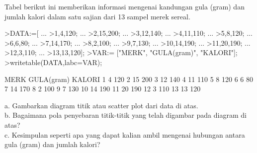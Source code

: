 \documentclass[a4paper,10pt]{article}
\begin{document}
\begin{eulernotebook}
\begin{eulercomment}
\begin{eulercomment}
\begin{eulercomment}
\begin{eulercomment}
\begin{eulercomment}
\begin{eulercomment}
\begin{eulercomment}
\begin{eulercomment}
\begin{eulercomment}
\begin{eulercomment}
\begin{eulercomment}
\begin{eulercomment}
\begin{eulercomment}
\begin{eulercomment}
\begin{eulercomment}
\begin{eulercomment}
\begin{eulercomment}
\end{eulercomment}
\eulersubheading{}
\begin{eulercomment}
Tabel berikut ini memberikan informasi mengenai kandungan gula (gram)
dan jumlah kalori dalam satu sajian dari 13 sampel merek sereal.
\end{eulercomment}
\begin{eulerprompt}
>DATA:=[ ...
>1,4,120; ...
>2,15,200; ...
>3,12,140; ...
>4,11,110; ...
>5,8,120; ...
>6,6,80; ...
>7,14,170; ...
>8,2,100; ...
>9,7,130; ...
>10,14,190; ...
>11,20,190; ...
>12,3,110; ...
>13,13,120];
>VAR:= ["MERK", "GULA(gram)", "KALORI"];
>writetable(DATA,labc=VAR);
\end{eulerprompt}
\begin{euleroutput}
        MERK GULA(gram)    KALORI
           1          4       120
           2         15       200
           3         12       140
           4         11       110
           5          8       120
           6          6        80
           7         14       170
           8          2       100
           9          7       130
          10         14       190
          11         20       190
          12          3       110
          13         13       120
\end{euleroutput}
\begin{eulercomment}
a. Gambarkan diagram titik atau scatter plot dari data di atas.\\
b. Bagaimana pola penyebaran titik-titik yang telah digambar pada
diagram di atas?\\
c. Kesimpulan seperti apa yang dapat kalian ambil mengenai hubungan
antara gula (gram) dan jumlah kalori?


\end{eulercomment}
\end{eulercomment}
\end{eulercomment}
\end{eulercomment}
\end{eulercomment}
\end{eulercomment}
\end{eulercomment}
\end{eulercomment}
\end{eulercomment}
\end{eulercomment}
\end{eulercomment}
\end{eulercomment}
\end{eulercomment}
\end{eulercomment}
\end{eulercomment}
\end{eulercomment}
\end{eulercomment}
\end{eulernotebook}
\end{document}
